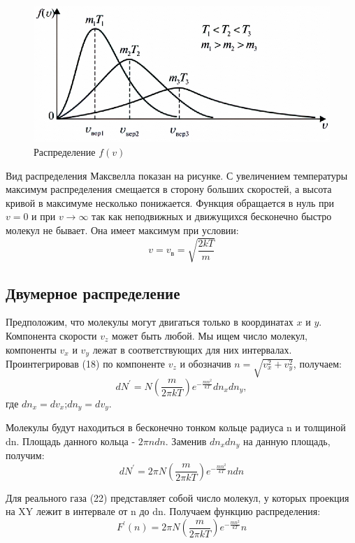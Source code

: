 \documentclass[a4paper,12pt]{article}
\begin{document}
\begin{figure}[h!]
\begin{center}
	\includegraphics[scale=0.6]{2}
\end{center}
\caption{Распределение $f(v)$}
\end{figure}
Вид распределения Максвелла показан на рисунке. С увеличением температуры максимум распределения смещается в сторону больших скоростей, а высота кривой в максимуме несколько понижается.
Функция обращается в нуль при $v=0$ и при $v \rightarrow \infty$ так как неподвижных и движущихся бесконечно быстро молекул не бывает. Она имеет максимум при условии:
$$v= v_в=\sqrt{\frac{2kT}{m}}$$

\newpage
\subsection{Двумерное распределение}
\hspace{\parindent}Предположим, что молекулы могут двигаться только в координатах $x$ и $y$. Компонента скорости $v_z$ может быть любой. Мы ищем число молекул, компоненты $v_x$ и $v_y$ лежат в соответствующих для них интервалах. Проинтегрировав (18) по компоненте $v_z$ и обозначив $n= \sqrt{v_x^2+v_y^2}$, получаем:
\begin{equation}
dN^\prime=N\left(\frac{m}{2\pi kT}\right)e^{-\frac{mn^2}{kT}}dn_xdn_y,
\end{equation}
где $dn_x=dv_x$;$dn_y=dv_y$.

Молекулы будут находиться в бесконечно тонком кольце радиуса n и толщиной dn. Площадь данного кольца - $2\pi ndn$. Заменив $dn_xdn_y$ на данную площадь, получим:
\begin{equation}
dN^\prime=2\pi N\left(\frac{m}{2\pi kT}\right)e^{-\frac{mn^2}{kT}}ndn
\end{equation}

Для реального газа (22) представляет собой число молекул, у которых проекция на XY лежит в интервале от n до dn. Получаем функцию распределения:
\begin{equation}
F^\prime\left(n\right)=2\pi N\left(\frac{m}{2\pi kT}\right)e^{-\frac{mn^2}{kT}}n
\end{equation}
\end{document}
